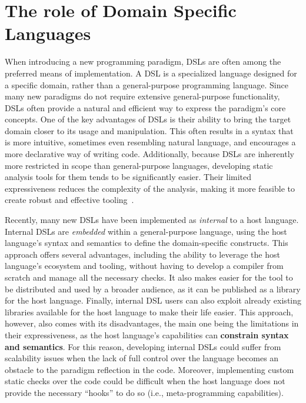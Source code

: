 \documentclass[12pt,a4paper,openright,twoside]{book}
\begin{document}
\section{The role of Domain Specific Languages} \label{sec:dsls}

When introducing a new programming paradigm, \acp{DSL} are often among the
preferred means of implementation. A \ac{DSL} is a specialized language designed
for a specific domain, rather than a general-purpose programming language. Since
many new paradigms do not require extensive general-purpose functionality,
\acp{DSL} often provide a natural and efficient way to express the paradigm’s
core concepts.
%
One of the key advantages of \acp{DSL} is their ability to bring the target
domain closer to its usage and manipulation. This often results in a syntax that
is more intuitive, sometimes even resembling natural language, and encourages a
more declarative way of writing code. Additionally, because \acp{DSL} are
inherently more restricted in scope than general-purpose languages, developing
static analysis tools for them tends to be significantly easier. Their limited
expressiveness reduces the complexity of the analysis, making it more feasible
to create robust and effective tooling~\cite{DBLP:journals/csur/MernikHS05}. 

Recently, many new \acp{DSL} have been implemented as \emph{internal} to a host
language. Internal \acp{DSL} are \emph{embedded} within a general-purpose
language, using the host language's syntax and semantics to define the
domain-specific constructs. This approach offers several advantages, including
the ability to leverage the host language's ecosystem and tooling, without
having to develop a compiler from scratch and manage all the necessary checks.
It also makes easier for the tool to be distributed and used by a broader
audience, as it can be published as a library for the host language.
%
Finally, internal \ac{DSL} users can also exploit already existing libraries
available for the host language to make their life easier. This approach,
however, also comes with its disadvantages, the main one being the limitations
in their expressiveness, as the host language's capabilities can
\textbf{constrain syntax and semantics}. For this reason, developing internal
\acp{DSL} could suffer from scalability issues when the lack of full control
over the language becomes an obstacle to the paradigm reflection in the code.
Moreover, implementing custom static checks over the code could be difficult
when the host language does not provide the necessary ``hooks'' to do so (i.e.,
meta-programming capabilities).
\end{document}
